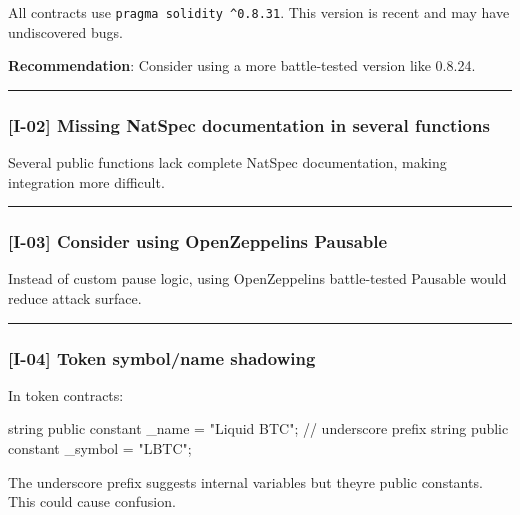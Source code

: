 \documentclass[
]{article}
\newenvironment{Shaded}{}{}
\newcommand{\NormalTok}[1]{#1}
\begin{document}
All contracts use \texttt{pragma\ solidity\ \^{}0.8.31}. This version is
recent and may have undiscovered bugs.

\textbf{Recommendation}: Consider using a more battle-tested version
like 0.8.24.

\begin{center}\rule{0.5\linewidth}{0.5pt}\end{center}

\subsubsection{{[}I-02{]} Missing NatSpec documentation in several
functions}\label{i-02-missing-natspec-documentation-in-several-functions}

Several public functions lack complete NatSpec documentation, making
integration more difficult.

\begin{center}\rule{0.5\linewidth}{0.5pt}\end{center}

\subsubsection{{[}I-03{]} Consider using OpenZeppelin\textquotesingle s
Pausable}\label{i-03-consider-using-openzeppelins-pausable}

Instead of custom pause logic, using OpenZeppelin\textquotesingle s
battle-tested Pausable would reduce attack surface.

\begin{center}\rule{0.5\linewidth}{0.5pt}\end{center}

\subsubsection{{[}I-04{]} Token symbol/name
shadowing}\label{i-04-token-symbolname-shadowing}

In token contracts:

\begin{Shaded}
\begin{Highlighting}[]
\NormalTok{string public constant \_name = "Liquid BTC";   // underscore prefix}
\NormalTok{string public constant \_symbol = "LBTC";}
\end{Highlighting}
\end{Shaded}

The underscore prefix suggests internal variables but
they\textquotesingle re public constants. This could cause confusion.
\end{document}
